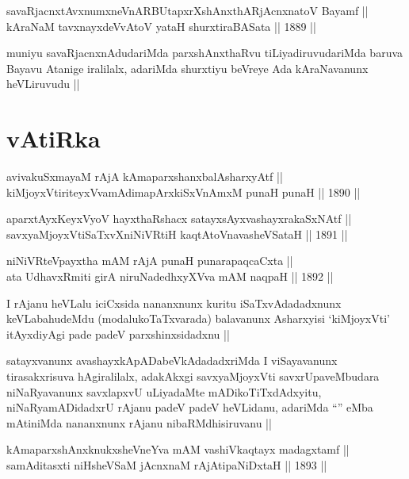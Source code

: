 \begin{shl}
savaRjacnxtAvxnumxneVnARBUtapxrXshAnxthARjAcnxnatoV Bayamf ||  \\
kAraNaM tavxnayxdeVvAtoV yataH shurxtiraBASata ||  1889 ||  
\end{shl}

\begin{artha}
muniyu savaRjacnxnAdudariMda parxshAnxthaRvu tiLiyadiruvudariMda
baruva Bayavu Atanige iralilalx, adariMda shurxtiyu beVreye Ada
kAraNavanunx heVLiruvudu ||
\end{artha}

\section*{vAtiRka}

\begin{shl}
avivakuSxmayaM rAjA kAmaparxshanxbalAsharxyAtf || \\
kiMjoyxVtiriteyxVvamAdimapArxkiSxVnAmxM punaH punaH ||  1890 ||  
\end{shl}
				
\begin{shl}
aparxtAyxKeyxVyoV hayxthaRshacx satayxsAyxvashayxrakaSxNAtf || \\
savxyaMjoyxVtiSaTxvXniNiVRtiH kaqtA\s toV\s navasheVSataH ||  1891 ||  
\end{shl}
				
\begin{shl}
niNiVRteV\s payxtha mAM rAjA punaH punarapaqcaCxta || \\
ata UdhavxRmiti girA niruNadedhxyXVva mAM naqpaH ||  1892 ||  
\end{shl}

\begin{artha}
I rAjanu heVLalu iciCxsida nananxnunx kuritu iSaTxvAdadadxnunx
keVLabahudeMdu (modalukoTaTxvarada) balavanunx Asharxyisi `kiMjoyxVti'
itAyxdiyAgi pade padeV parxshinxsidadxnu ||
\end{artha}

\begin{artha}
satayxvanunx avashayxkApADabeVkAdadadxriMda I viSayavanunx
tirasakxrisuva hAgiralilalx, adakAkxgi savxyaMjoyxVti
savxrUpaveMbudara niNaRyavanunx savxlapxvU uLiyadaMte
mADikoTiTxdAdxyitu, niNaRyamADidadxrU rAjanu padeV padeV heVLidanu,
adariMda ``\stext'' eMba mAtiniMda nananxnunx rAjanu nibaRMdhisiruvanu ||
\end{artha}

\begin{shl}
kAmaparxshAnxknukxsheVneYva mAM vashiVkaqtayx madagxtamf || \\
samAditasxti niHsheVSaM jAcnxnaM rAjA\s tipaNiDxtaH ||  1893 ||  
\end{shl}

